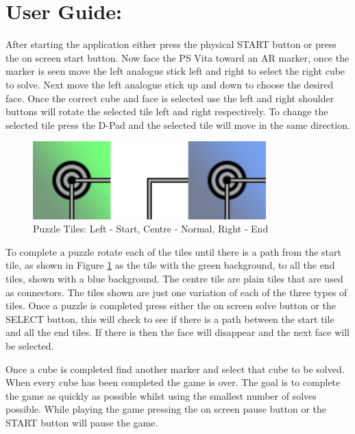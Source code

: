 \section{User Guide:}\label{sc:userguide}

After starting the application either press the physical START button or press the on screen start button.
Now face the PS Vita toward an AR marker, once the marker is seen move the left analogue stick left and right to select the right cube to solve.
Next move the left analogue stick up and down to choose the desired face.
Once the correct cube and face is selected use the left and right shoulder buttons will rotate the selected tile left and right respectively.
To change the selected tile press the D-Pad and the selected tile will move in the same direction. 

\begin{figure}[ht!]
	\centering
	\includegraphics[width=90mm]{images/tiles.png}
	\caption{Puzzle Tiles: Left - Start, Centre - Normal, Right - End}
	\label{fig:tiles}
\end{figure}

To complete a puzzle rotate each of the tiles until there is a path from the start tile, as shown in Figure \ref{fig:tiles} as the tile with the green background, to all the end tiles, shown with a blue background.
The centre tile are plain tiles that are used as connectors.
The tiles shown are just one variation of each of the three types of tiles.
Once a puzzle is completed press either the on screen solve button or the SELECT button, this will check to see if there is a path between the start tile and all the end tiles.
If there is then the face will disappear and the next face will be selected. 

Once a cube is completed find another marker and select that cube to be solved.
When every cube has been completed the game is over.
The goal is to complete the game as quickly as possible whilst using the smallest number of solves possible.
While playing the game pressing the on screen pause button or the START button will pause the game.